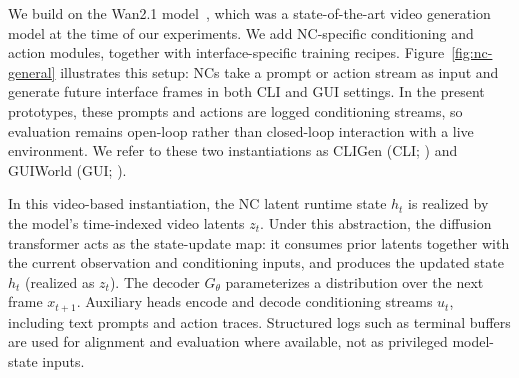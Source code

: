 We build on the Wan2.1 model~\citep{wan2025wan}, which was a state-of-the-art video generation model at the time of our experiments.
We add NC-specific conditioning and action modules, together with interface-specific training recipes.
Figure~\ref{fig:nc-general} illustrates this setup: NCs take a prompt or action stream as input and generate future interface frames in both CLI and GUI settings. In the present prototypes, these prompts and actions are logged conditioning streams, so evaluation remains open-loop rather than closed-loop interaction with a live environment.
We refer to these two instantiations as CLIGen (CLI; ) and GUIWorld (GUI; ).

In this video-based instantiation, the NC latent runtime state $h_t$ is realized by the model’s time-indexed video latents $z_t$.
Under this abstraction, the diffusion transformer acts as the state-update map: it consumes prior latents together with the current observation and conditioning inputs, and produces the updated state $h_t$ (realized as $z_t$).
The decoder $G_\theta$ parameterizes a distribution over the next frame $x_{t+1}$.
Auxiliary heads encode and decode conditioning streams $u_t$, including text prompts and action traces.
Structured logs such as terminal buffers are used for alignment and evaluation where available, not as privileged model-state inputs.
